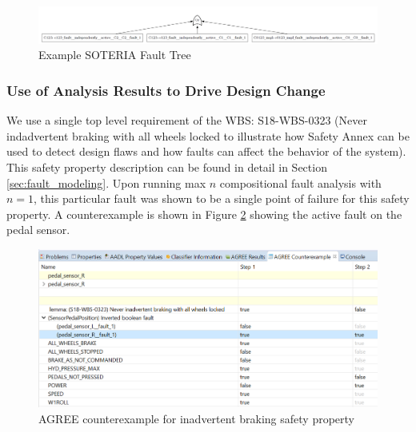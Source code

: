 \begin{enumerate}
\begin{figure}[h!]
	\hspace*{-2cm}
	\vspace{-0.1in} 
	\begin{center}
		\includegraphics[scale=0.25]{images/Soteria_FT.png}
		\caption{Example SOTERIA Fault Tree}
		\label{fig:soteriaFT}
	\end{center}
\end{figure}

\end{enumerate}

\subsubsection{Use of Analysis Results to Drive Design Change}
We use a single top level requirement of the WBS: S18-WBS-0323 (Never indadvertent braking with all wheels locked to illustrate how Safety Annex can be used to detect design flaws and how faults can affect the behavior of the system). This safety property description can be found in detail in Section \ref{sec:fault_modeling}. Upon running max $n$ compositional fault analysis with $n = 1$, this particular fault was shown to be a single point of failure for this safety property. A counterexample is shown in Figure \ref{fig:counterexample} showing the active fault on the pedal sensor. 

\begin{figure}[h!]
	\begin{center}
		\includegraphics[width=\textwidth]{images/counterexample.png}
	\end{center}
	\vspace{-0.3in}
	\caption{AGREE counterexample for inadvertent braking safety property}
	\label{fig:counterexample}
\end{figure} 

